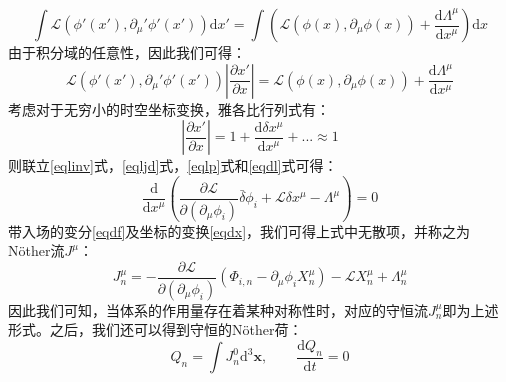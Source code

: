 \begin{equation}
	\int\mathscr{L}(\phi'(x'),\partial_\mu'\phi'(x'))\mathrm{d}x'=\int\left(\mathscr{L}(\phi(x),\partial_\mu\phi(x))+\frac{\mathrm{d}\Lambda^\mu}{\mathrm{d}x^\mu}\right)\mathrm{d}x
\end{equation}
由于积分域的任意性，因此我们可得：
\begin{equation}
	\mathscr{L}(\phi'(x'),\partial_\mu'\phi'(x'))\left|\frac{\partial x'}{\partial x}\right|=\mathscr{L}(\phi(x),\partial_\mu\phi(x))+\frac{\mathrm{d}\Lambda^\mu}{\mathrm{d}x^\mu}
	\label{eqlinv}
\end{equation}
考虑对于无穷小的时空坐标变换，雅各比行列式有：
\begin{equation}
	\left|\frac{\partial x'}{\partial x}\right|=1+\frac{\mathrm{d}\delta x^\mu}{\mathrm{d}x^\mu}+...\approx1
	\label{eqljd}
\end{equation}
则联立\eqref{eqlinv}式，\eqref{eqljd}式，\eqref{eqlp}式和\eqref{eqdl}式可得：
\begin{equation}
	\frac{\mathrm{d}}{\mathrm{d}x^\mu}\left(\frac{\partial\mathscr{L}}{\partial(\partial_\mu\phi_i)}\bar{\delta}\phi_i+\mathscr{L}\delta x^\mu-\Lambda^\mu\right) =0
\end{equation}
带入场的变分\eqref{eqdf}及坐标的变换\eqref{eqdx}，我们可得上式中无散项，并称之为N\"other流$J^\mu$：
\begin{equation}
	J^\mu_n=-\frac{\partial\mathscr{L}}{\partial(\partial_\mu\phi_i)}(\Phi_{i,n}-\partial_\mu\phi_iX^\mu_n)-\mathscr{L}X^\mu_n+\Lambda^\mu_n
\end{equation}
因此我们可知，当体系的作用量存在着某种对称性时，对应的守恒流$J^\mu_n$即为上述形式。之后，我们还可以得到守恒的N\"other荷：
\begin{equation}
	Q_n=\int J^0_n\mathrm{d}^3\boldsymbol{x},\qquad\frac{\mathrm{d}Q_n}{\mathrm{d}t}=0
\end{equation}

